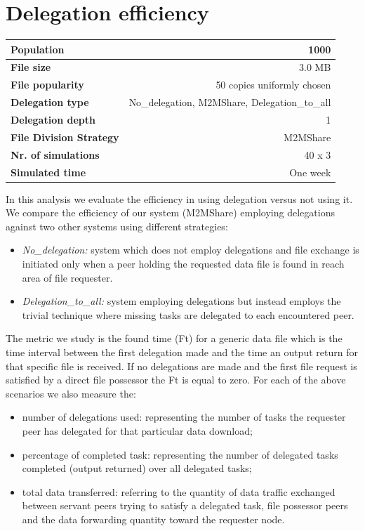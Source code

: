 \section{Delegation efficiency}
\label{analisiDelegationEfficiency}
\begin{table}[h]
\begin{center}
\begin{tabular}{|l|r|}
\hline
\bfseries Population & 1000 \\
\hline
\bfseries File size & 3.0 MB \\
\hline
\bfseries File popularity & 50 copies uniformly chosen \\
\hline
\bfseries Delegation type & No\_delegation, M2MShare, Delegation\_to\_all \\
\hline
\bfseries Delegation depth & 1 \\
\hline
\bfseries File Division Strategy & M2MShare \\
\hline
\bfseries Nr. of simulations & 40 x 3\\
\hline
\bfseries Simulated time & One week \\
\hline
\end{tabular}
\end{center}
\end{table}
In this analysis we evaluate the efficiency in using delegation versus not using it.
We compare the efficiency of our system (M2MShare) employing delegations against two other systems using different strategies:
\begin{itemize}
\item \textit{No\_delegation:} system which does not employ delegations and file exchange is initiated only when a peer holding the requested data file is found in reach area of file requester.
\item \textit{Delegation\_to\_all:} system employing delegations but instead employs the trivial technique where missing tasks are delegated to each encountered peer.
\end{itemize}

The metric we study is the found time (Ft) for a generic data file which is the time interval between the first delegation made and the time an output return for that specific file is
received. If no delegations are made and the first file request is satisfied by a direct file possessor the Ft is equal to zero. For each of the above scenarios we also measure the:
\begin{itemize}
\item number of delegations used: representing the number of tasks the requester peer has delegated for that particular data download;
\item percentage of completed task: representing the number of delegated tasks completed (output returned) over all delegated tasks;
\item total data transferred: referring to the quantity of data traffic exchanged between servant peers trying to satisfy a delegated task, file possessor peers and the data forwarding quantity toward the requester node.
\end{itemize}

